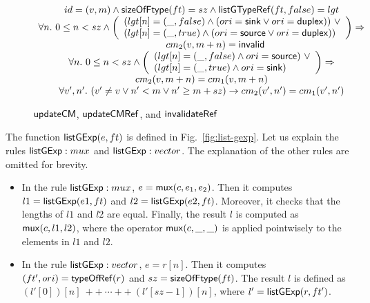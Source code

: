 {\begin{figure}[htbp]
\begin{gather*}
{\begin{array}{c}
				id = (v, m) \wedge {\sf sizeOfFtype}(ft) = sz \wedge {\sf listGTypeRef}(ft, false) = lgt \\
				\forall n.\ 0 \le n < sz \wedge 
				\left(
				\begin{array}{l}
					(lgt[n] = (\_, false) \wedge (ori = {\sf sink}\vee ori = {\sf duplex}))\ \vee \\
					(lgt[n] = (\_, true) \wedge (ori = {\sf source}\vee ori = {\sf duplex}))
				\end{array}
				\right) \Rightarrow\\
				\hspace{1cm}  cm_2(v, m+n) = {\sf invalid}\\
				\forall n.\ 0 \le n < sz \wedge 
				\left(
				\begin{array}{l}
					(lgt[n] = (\_, false) \wedge ori = {\sf source})\ \vee \\
					(lgt[n] = (\_, true) \wedge ori = {\sf sink})
				\end{array}
				\right)  
				\Rightarrow \\
				cm_2(v, m+n) = cm_1(v, m+n)  \\
				\forall v', n'.\ (v' \neq v \vee n' < m  \vee n' \ge m+sz)  \rightarrow cm_2(v', n') = cm_1(v', n')
			\end{array}
		}
	\end{gather*}
	\caption{${\sf updateCM}$, ${\sf updateCMRef}$, and ${\sf invalidateRef}$}
	\label{tab:update-vm-ct}
\end{figure}
}


The function ${\sf listGExp}(e, ft)$ is defined in Fig.~\ref{fig:list-gexp}. 
Let us explain the rules ${\sf listGExp}: mux$ and ${\sf listGExp}: vector$. The explanation of the other rules are omitted for brevity. 
%
\begin{itemize}
	\item In the rule ${\sf listGExp}: mux$, $e = {\sf mux}(c, e_1, e_2)$. Then it computes $l1 = {\sf listGExp}(e1, ft)$ and $l2 = {\sf listGExp}(e2, ft)$. Moreover, it checks that the lengths of $l1$ and $l2$ are equal. Finally, the result $l$ is computed as ${\sf mux}(c, l1, l2)$, where the operator ${\sf mux}(c, \_, \_)$ is applied pointwisely to the elements in $l1$ and $l2$. 
	\item In the rule ${\sf listGExp}: vector$, $e = r[n]$. Then it computes $(ft', ori) = {\sf typeOfRef}(r)$ and $sz  = {\sf sizeOfFtype}(ft)$. The result $l$ is defined as $(l'[0])[n]\ ++\ \cdots ++\ (l'[sz-1])[n]$, where $l' = {\sf listGExp}(r, ft')$. 
\end{itemize}

